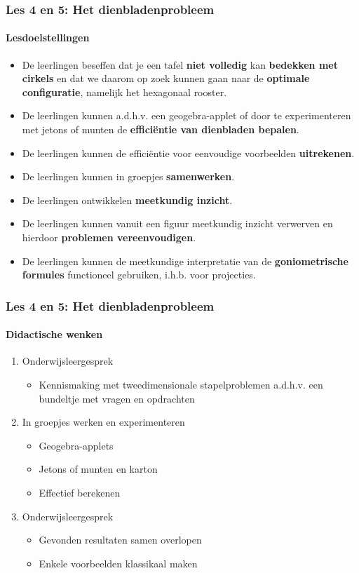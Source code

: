 \documentclass[dutch]{beamer}
\begin{document}
\begin{frame}
\frametitle{Les 4 en 5: Het dienbladenprobleem}
\framesubtitle{Lesdoelstellingen}
\begin{itemize}
\item De leerlingen beseffen dat je een tafel \textbf{niet volledig} kan \textbf{bedekken met cirkels} en dat we daarom op zoek kunnen gaan naar de \textbf{optimale configuratie}, namelijk het hexagonaal rooster.
\item De leerlingen kunnen a.d.h.v. een geogebra-applet of door te experimenteren met jetons of munten de \textbf{effici\"{e}ntie van dienbladen bepalen}.
\item De leerlingen kunnen de effici\"{e}ntie voor eenvoudige voorbeelden \textbf{uitrekenen}.
\item De leerlingen kunnen in groepjes \textbf{samenwerken}.
\item De leerlingen ontwikkelen \textbf{meetkundig inzicht}.
\item De leerlingen kunnen vanuit een figuur meetkundig inzicht verwerven en hierdoor \textbf{problemen vereenvoudigen}.
\item De leerlingen kunnen de meetkundige interpretatie van de \textbf{goniometrische formules} functioneel gebruiken, i.h.b. voor projecties.
\end{itemize}
\end{frame}

\begin{frame}
\frametitle{Les 4 en 5: Het dienbladenprobleem}
\framesubtitle{Didactische wenken}

\begin{enumerate}
	\item Onderwijsleergesprek
	\begin{itemize}
	\item Kennismaking met tweedimensionale stapelproblemen a.d.h.v. een bundeltje met vragen en opdrachten
\end{itemize}
	
	\item In groepjes werken en experimenteren 
	\begin{itemize}
	\item Geogebra-applets
	\item Jetons of munten en karton
	\item Effectief berekenen
\end{itemize}

  \item Onderwijsleergesprek
  \begin{itemize}
	\item Gevonden resultaten samen overlopen
	\item Enkele voorbeelden klassikaal maken
\end{itemize}
\end{enumerate}
\end{frame}
\end{document}
